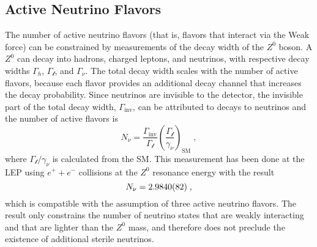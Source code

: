 \subsection{Active Neutrino Flavors}

The number of active neutrino flavors (that is, flavors that interact via the Weak force) can be constrained by measurements of the decay width of the $Z^0$ boson. A $Z^0$ can decay into hadrons, charged leptons, and neutrinos, with respective decay widths $\Gamma_h$, $\Gamma_\mathcal{l}$, and $\Gamma_\nu$. The total decay width scales with the number of active flavors, because each flavor provides an additional decay channel that increases the decay probability. Since neutrinos are invisible to the detector, the invisible part of the total decay width, $\Gamma_\mathrm{inv}$, can be attributed to decays to neutrinos and the number of active flavors is
\begin{equation}
    N_\nu = \frac{\Gamma_\mathrm{inv}}{\Gamma_\mathcal{l}}\left( \frac{\Gamma_\mathcal{l}}{\gamma_\nu} \right)_\mathrm{SM}\;,
\end{equation}
where $\Gamma_\mathcal{l} / \gamma_\nu$ is calculated from the SM. This measurement has been done at the LEP using $e^+ + e^-$ collisions at the $Z^0$ resonance energy with the result
\begin{equation}
    N_\nu = \num{2.9840 +- 0.0082}\;,
\end{equation}
which is compatible with the assumption of three active neutrino flavors. The result only constrains the number of neutrino states that are weakly interacting and that are lighter than the $Z^0$ mass, and therefore does not preclude the existence of additional sterile neutrinos.



